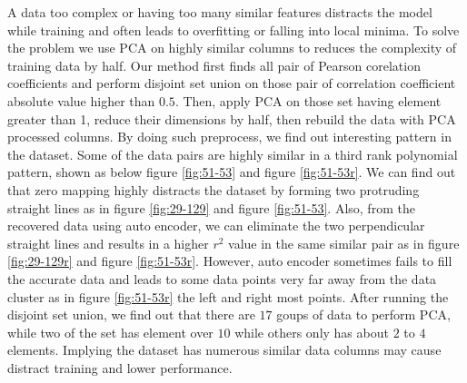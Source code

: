 \documentclass[10pt,a4paper]{article}
\begin{document}
A data too complex or having too many similar features distracts the model while training and often leads to overfitting or falling into local minima.
To solve the problem we use PCA on highly similar columns to reduces the complexity of training data by half.
Our method first finds all pair of Pearson corelation coefficients and perform disjoint set union on those pair of correlation coefficient absolute value higher than $0.5$.
Then, apply PCA on those set having element greater than 1, reduce their dimensions by half, then rebuild the data with PCA processed columns.
By doing such preprocess, we find out interesting pattern in the dataset.
Some of the data pairs are highly similar in a third rank polynomial pattern, shown as below figure \ref{fig:51-53} and figure \ref{fig:51-53r}.
We can find out that zero mapping highly distracts the dataset by forming two protruding straight lines as in figure \ref{fig:29-129} and figure \ref{fig:51-53}.
Also, from the recovered data using auto encoder, we can eliminate the two perpendicular straight lines and results in a higher $r^2$ value in the same similar pair as in figure \ref{fig:29-129r} and figure \ref{fig:51-53r}.
However, auto encoder sometimes fails to fill the accurate data and leads to some data points very far away from the data cluster as in figure \ref{fig:51-53r} the left and right most points.
After running the disjoint set union, we find out that there are $17$ goups of data to perform PCA, while two of the set has element over $10$ while others only has about $2$ to $4$ elements.
Implying the dataset has numerous similar data columns may cause distract training and lower performance.
\end{document}
